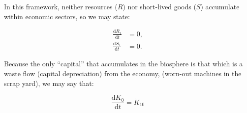 In this framework, neither resources ($R$) 
nor short-lived goods ($S$) accumulate 
within economic sectors, 
so we may state:

\begin{align}\label{eq:A-dS_1/dt_zero}
	\frac{\mathrm{d}R_1}{\mathrm{d}t}				&
	= 0,																	\\
	\frac{\mathrm{d}S_1}{\mathrm{d}t}				&
	= 0.
\end{align}




Because the only ``capital'' that accumulates 
in the biosphere
is that which is a waste flow 
(capital depreciation)
from the economy,
(worn-out machines in the scrap yard),
we may say that:

\begin{equation} \label{eq:A_K0_balance}
	\frac{\mathrm{d}K_{0}}{\mathrm{d}t}		
	= \dot{K}_{10}
\end{equation}

